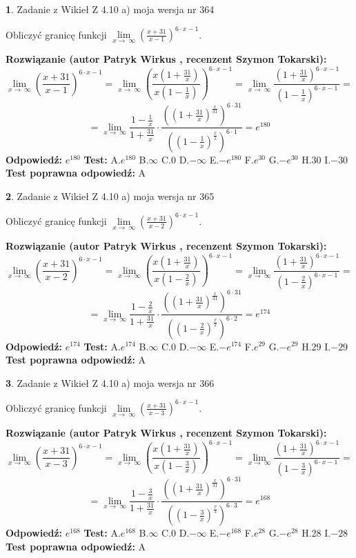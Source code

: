\documentclass[12pt, a4paper]{article}
\theoremstyle{definition} %
\newtheorem{zad}{}
\newcommand{\zadStart}[1]{\begin{zad}#1\newline}
\newcommand{\zadStop}{\end{zad}}
\newcommand{\rozwStart}[2]{\noindent \textbf{Rozwiązanie (autor #1 , recenzent #2): }\newline}
\newcommand{\rozwStop}{\newline}
\newcommand{\odpStart}{\noindent \textbf{Odpowiedź:}\newline}
\newcommand{\odpStop}{\newline}
\newcommand{\testStart}{\noindent \textbf{Test:}\newline}
\newcommand{\testStop}{\newline}
\newcommand{\kluczStart}{\noindent \textbf{Test poprawna odpowiedź:}\newline}
\newcommand{\kluczStop}{\newline}
\begin{document}
\zadStart{Zadanie z Wikieł Z 4.10 a) moja wersja nr 364}

Obliczyć granicę funkcji  $\lim\limits_{x\to\ \infty}(\frac{x+31}{x-1})^{6\cdot x-1}$.
\zadStop
\rozwStart{Patryk Wirkus}{Szymon Tokarski}
$$\lim\limits_{x\to\ \infty}(\frac{x+31}{x-1})^{6\cdot x-1} = \lim\limits_{x\to\ \infty}(\frac{x(1+\frac{31}{x})}{x(1-\frac{1}{x})})^{6\cdot x-1}=\lim\limits_{x\to\ \infty}\frac{(1+\frac{31}{x})^{6\cdot x-1}}{(1-\frac{1}{x})^{6\cdot x-1}}=$$
$$=\lim\limits_{x\to\ \infty}\frac{1-\frac{1}{x}}{1+\frac{31}{x}}\cdot\frac{((1+\frac{31}{x})^{\frac{x}{31}})^{6\cdot31}}{((1-\frac{1}{x})^{\frac{x}{1}})^{6\cdot1}}=e^{180}$$
\rozwStop
\odpStart
$e^{180}$
\odpStop
\testStart
A.$e^{180}$ B.$\infty$ C.$0$ D.$-\infty$ E.$-e^{180}$
F.$e^{30}$ G.$-e^{30}$
H.$30$
I.$-30$
\testStop
\kluczStart
A
\kluczStop



\zadStart{Zadanie z Wikieł Z 4.10 a) moja wersja nr 365}

Obliczyć granicę funkcji  $\lim\limits_{x\to\ \infty}(\frac{x+31}{x-2})^{6\cdot x-1}$.
\zadStop
\rozwStart{Patryk Wirkus}{Szymon Tokarski}
$$\lim\limits_{x\to\ \infty}(\frac{x+31}{x-2})^{6\cdot x-1} = \lim\limits_{x\to\ \infty}(\frac{x(1+\frac{31}{x})}{x(1-\frac{2}{x})})^{6\cdot x-1}=\lim\limits_{x\to\ \infty}\frac{(1+\frac{31}{x})^{6\cdot x-1}}{(1-\frac{2}{x})^{6\cdot x-1}}=$$
$$=\lim\limits_{x\to\ \infty}\frac{1-\frac{2}{x}}{1+\frac{31}{x}}\cdot\frac{((1+\frac{31}{x})^{\frac{x}{31}})^{6\cdot31}}{((1-\frac{2}{x})^{\frac{x}{2}})^{6\cdot2}}=e^{174}$$
\rozwStop
\odpStart
$e^{174}$
\odpStop
\testStart
A.$e^{174}$ B.$\infty$ C.$0$ D.$-\infty$ E.$-e^{174}$
F.$e^{29}$ G.$-e^{29}$
H.$29$
I.$-29$
\testStop
\kluczStart
A
\kluczStop



\zadStart{Zadanie z Wikieł Z 4.10 a) moja wersja nr 366}

Obliczyć granicę funkcji  $\lim\limits_{x\to\ \infty}(\frac{x+31}{x-3})^{6\cdot x-1}$.
\zadStop
\rozwStart{Patryk Wirkus}{Szymon Tokarski}
$$\lim\limits_{x\to\ \infty}(\frac{x+31}{x-3})^{6\cdot x-1} = \lim\limits_{x\to\ \infty}(\frac{x(1+\frac{31}{x})}{x(1-\frac{3}{x})})^{6\cdot x-1}=\lim\limits_{x\to\ \infty}\frac{(1+\frac{31}{x})^{6\cdot x-1}}{(1-\frac{3}{x})^{6\cdot x-1}}=$$
$$=\lim\limits_{x\to\ \infty}\frac{1-\frac{3}{x}}{1+\frac{31}{x}}\cdot\frac{((1+\frac{31}{x})^{\frac{x}{31}})^{6\cdot31}}{((1-\frac{3}{x})^{\frac{x}{3}})^{6\cdot3}}=e^{168}$$
\rozwStop
\odpStart
$e^{168}$
\odpStop
\testStart
A.$e^{168}$ B.$\infty$ C.$0$ D.$-\infty$ E.$-e^{168}$
F.$e^{28}$ G.$-e^{28}$
H.$28$
I.$-28$
\testStop
\kluczStart
A
\kluczStop
\end{document}
